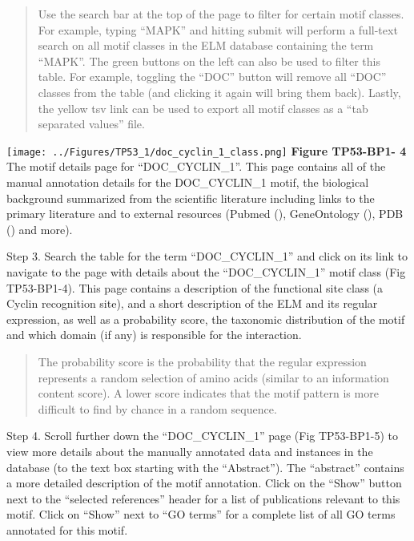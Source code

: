\begin{quote}
Use the search bar at the top of the page to filter for certain motif
classes. For example, typing ``MAPK'' and hitting submit will perform a
full-text search on all motif classes in the ELM database containing the
term ``MAPK''. The green buttons on the left can also be used to filter
this table. For example, toggling the ``DOC'' button will remove all
``DOC'' classes from the table (and clicking it again will bring them
back). Lastly, the yellow tsv link can be used to export all motif
classes as a ``tab separated values'' file.
\end{quote}

\texttt{[image: ../Figures/TP53\_1/doc\_cyclin\_1\_class.png]}
\textbf{Figure TP53-BP1- 4} The motif details page for
``DOC\_CYCLIN\_1''. This page contains all of the manual annotation
details for the DOC\_CYCLIN\_1 motif, the biological background
summarized from the scientific literature including links to the primary
literature and to external resources (Pubmed (\cite{27899561}),
GeneOntology (\cite{27899567}), PDB (\cite{12037327}) and more).

Step 3. Search the table for the term ``DOC\_CYCLIN\_1'' and click on
its link to navigate to the page with details about the
``DOC\_CYCLIN\_1'' motif class (Fig TP53-BP1-4). This page contains a
description of the functional site class (a Cyclin recognition site),
and a short description of the ELM and its regular expression, as well
as a probability score, the taxonomic distribution of the motif and
which domain (if any) is responsible for the interaction.

\begin{quote}
The probability score is the probability that the regular expression
represents a random selection of amino acids (similar to an information
content score). A lower score indicates that the motif pattern is more
difficult to find by chance in a random sequence.
\end{quote}

Step 4. Scroll further down the ``DOC\_CYCLIN\_1'' page (Fig TP53-BP1-5)
to view more details about the manually annotated data and instances in
the database (to the text box starting with the ``Abstract''). The
``abstract'' contains a more detailed description of the motif
annotation. Click on the ``Show'' button next to the ``selected
references'' header for a list of publications relevant to this motif.
Click on ``Show'' next to ``GO terms'' for a complete list of all GO
terms annotated for this motif.

